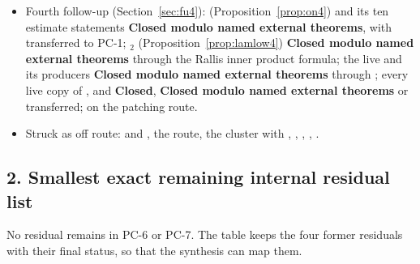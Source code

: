 \documentclass[11pt]{article}
\newcommand{\PC}[1]{\textsf{PC-#1}}
\newcommand{\sC}{\textbf{Closed}}
\newcommand{\sE}{\textbf{Closed modulo named external theorems}}
\theoremstyle{remark}
\begin{document}
\begin{itemize}[nosep]
\item Fourth follow-up (Section~\ref{sec:fu4}):  (Proposition~\ref{prop:on4}) and its ten estimate statements \sE, with  transferred to \PC{1}; $_2$ (Proposition~\ref{prop:lamlow4}) \sE{} through the Rallis inner product formula; the live  and its producers \sE{} through ; every live copy of ,  and  \sC, \sE{} or transferred;  on the patching route.
\item Struck as off route:  and , the  route, the  cluster with , , , , .
\end{itemize}

\subsection*{2. Smallest exact remaining internal residual list}

No residual remains in \PC{6} or \PC{7}. The table keeps the four former residuals with their final status, so that the synthesis can map them.
\end{document}
